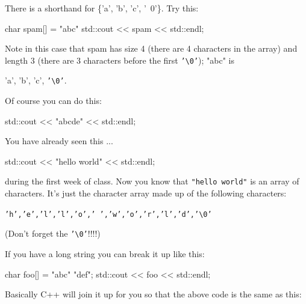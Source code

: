 
There is a shorthand for \{'a', 'b', 'c', '\ 0'\}. Try this:

\begin{consolethree}[escapeinside=||]
char spam[] = "abc"
std::cout << spam << std::endl;
\end{consolethree}

Note in this case that spam has size 4 (there are 4 characters in the array) and length 3 (there are 3 characters before the first \texttt{'\textbackslash 0'}); "abc" is

\begin{center}
'a', 'b', 'c', \texttt{'\textbackslash 0'}.
\end{center}




Of course you can do this:

\begin{consolethree}[escapeinside=||]
std::cout << "abc\0de" << std::endl;
\end{consolethree}

You have already seen this ...

\begin{consolethree}[escapeinside=||]
std::cout << "hello world" << std::endl;
\end{consolethree}

during the first week of class. Now you know that \texttt{"hello world"} is an array of characters. It's just the character array made up of the following characters:

\begin{center}
\texttt{'h','e','l','l','o',' ','w','o','r','l','d','\textbackslash 0'}
\end{center}

(Don't forget the \texttt{'\textbackslash 0'}!!!!)


If you have a long string you can break it up like this:

\begin{consolethree}[escapeinside=||]
char foo[] = "abc"
             "def";
std::cout << foo << std::endl;
\end{consolethree}

Basically C++ will join it up for you so that the above code is the same as this:

